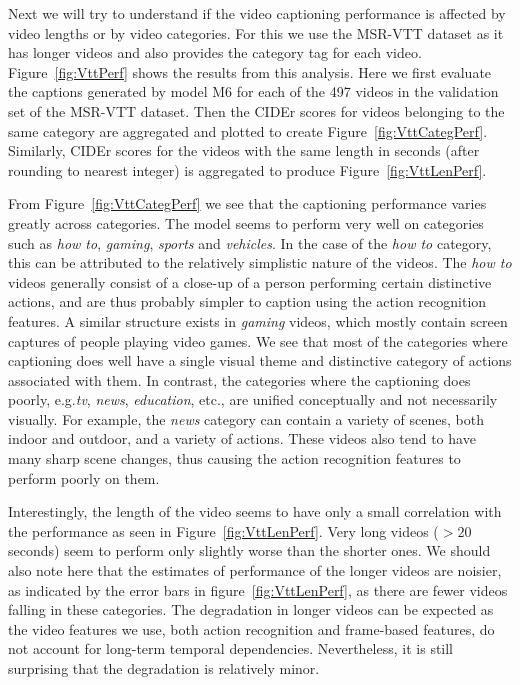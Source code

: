 Next we will try to understand if the video captioning performance is affected by
video lengths or by video categories.
For this we use the MSR-VTT dataset as it has longer videos and also provides
the category tag for each video.
Figure~\ref{fig:VttPerf} shows the results from this analysis.
Here we first evaluate the captions generated by model M6 for each of the 497
videos in the validation set of the MSR-VTT dataset.
Then the CIDEr scores for videos belonging to the same category are aggregated
and plotted to create Figure~\ref{fig:VttCategPerf}.
Similarly, CIDEr scores for the videos with the same length in seconds (after
rounding to nearest integer) is aggregated to produce
Figure~\ref{fig:VttLenPerf}.

From Figure~\ref{fig:VttCategPerf} we see that the captioning performance varies
greatly across categories.
The model seems to perform very well on categories such as \emph{how to},
\emph{gaming},
\emph{sports} and \emph{vehicles}.
In the case of the \emph{how to} category, this can be attributed to the relatively
simplistic nature of the videos.
The \emph{how to} videos generally consist of a close-up of a person performing
certain distinctive actions, and are thus probably simpler to caption using the
action recognition features. 
A similar structure exists in \emph{gaming} videos, which mostly contain screen
captures of people playing video games.
We see that most of the categories where captioning does well have a single
visual theme and distinctive category of actions associated with them. 
In contrast, the categories where the captioning does poorly, e.g.\@ \emph{tv},
\emph{news}, \emph{education}, etc.\@, are unified conceptually and not necessarily
visually.
For example, the \emph{news} category can contain a variety of scenes, both
indoor and outdoor, and a variety of actions. 
These videos also tend to have many sharp scene changes, thus causing the action
recognition features to perform poorly on them.

Interestingly, the length of the video seems to have only a small correlation with
the performance as seen in Figure~\ref{fig:VttLenPerf}.
Very long videos ($>20$ seconds) seem to perform only slightly worse than the
shorter ones.
We should also note here that the estimates of performance of the longer videos
are noisier, as indicated by the error bars in figure~\ref{fig:VttLenPerf}, as
there are fewer videos falling in these categories. 
The degradation in longer videos can be expected as the video features we use,
both action recognition and frame-based features, do not account for long-term
temporal dependencies.
Nevertheless, it is still surprising that the degradation is relatively minor.

